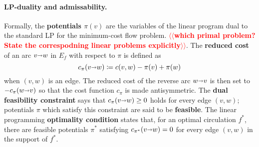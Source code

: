 \documentclass[11pt]{article}
\makeatletter
\def\arcto{\mathord\shortrightarrow}
\def\arc#1#2{#1\arcto#2}
\theoremstyle{plain}
\numberwithin{figure}{section}
\def\EMPH#1{\textbf{\boldmath #1}}
\def\n@te#1{\textsf{\boldmath \textbf{$\langle\!\langle$#1$\rangle\!\rangle$}}\leavevmode}
\def\note#1{\textcolor{red}{\n@te{#1}}}
\makeatother
\begin{document}
%
%
%
%

\paragraph{LP-duality and admissability.}
Formally, the
\EMPH{potentials $\pi(v)$} are the variables of the linear program dual to the standard LP for the minimum-cost flow problem.
\note{which primal problem? State the correspodning linear problems explicitly}.
The \EMPH{reduced cost} of an arc $\arc vw$ in $E_f$ with respect to $\pi$ is defined as
\[
\EMPH{$c_\pi(\arc vw)$} \coloneqq c(v, w) - \pi(v) + \pi(w)
\]
when $(v, w)$ is an edge.  The reduced cost of the reverse arc $\arc wv$ is then set to $-c_\pi(\arc wv)$ so that the cost function $c_\pi$ is made antisymmetric.
%
The \EMPH{dual feasibility constraint} says that $c_\pi(\arc vw) \geq 0$ holds for every edge $(v, w)$; potentials $\pi$ which satisfy this constraint are said to be \EMPH{feasible}.
%
The linear programming \EMPH{optimality condition} states that, for an optimal
circulation $f^*$, there are feasible potentials $\pi^*$ satisfying
$c_{\pi^*}(\arc vw) = 0$ for every edge $(v, w)$ in the support of $f^*$.
\end{document}
